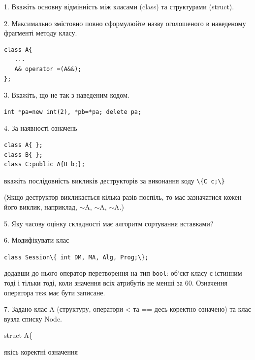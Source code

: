 \documentclass[12pt, ukrainian]{article}
\def\code#1{\Verb!#1!}
\begin{document}
{%
1. Вкажіть основну відмінність між класами (class) та структурами (struct).%
\par
\vspace{2mm}
2. Максимально змістовно повно сформулюйте назву оголошеного в наведеному фрагменті методу класу.
\vspace{-3mm}
\begin{verbatim}class A{
   ...
   A& operator =(A&&);
};\end{verbatim}
\vspace{-3mm}
\par
\vspace{2mm}
3. Вкажіть, що не так з наведеним кодом.
\vspace{-3mm}
\begin{verbatim}int *pa=new int(2), *pb=*pa; delete pa;\end{verbatim}
\vspace{-3mm}
\par
\vspace{2mm}
4. За наявності означень
\vspace{-3mm}
\begin{verbatim}
class A{ };
class B{ };
class C:public A{B b;};\end{verbatim}
\vspace{-3mm}
вкажіть послідовність викликів деструкторів за виконання коду \code{\{C c;\}} 

(Якщо деструктор викликається кілька разів поспіль, то має зазначатися кожен його виклик, наприклад, $\sim$A, $\sim$A, $\sim$A.)

\vspace{2mm}
5. Яку часову оцінку складності має алгоритм сортування вставками?
\par
\vspace{2mm}
6. Модифікувати клас 

\qquad\code{class Session\{ int DM, MA, Alg, Prog;\};} 


додавши до нього оператор перетворення на тип \code{bool}: об'єкт класу є істинним тоді і тільки тоді, коли значення всіх атрибутів не менші за 60. Означення оператора теж має бути записане.%
\par
\vspace{2mm}
7. 
Задано клас A (структуру, оператори < та == десь коректно означено) та клас вузла списку Node.

struct A\{

\quad  якісь коректні означення 

}
\end{document}
